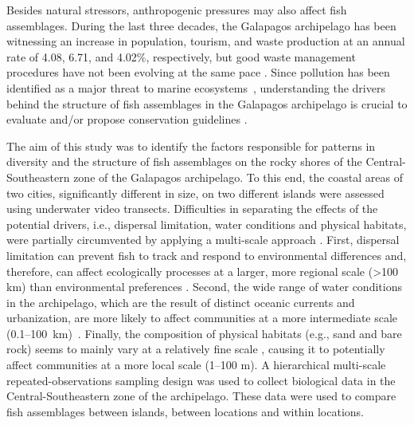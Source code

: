 \documentclass[jmse,article,accept,moreauthors,pdftex]{Definitions/mdpi}
\begin{document}
Besides natural stressors, anthropogenic pressures may also affect fish assemblages. During the last three decades, the Galapagos archipelago has been witnessing an increase in population, tourism, and waste production at an annual rate of 4.08, 6.71, and \mbox{4.02\%}, respectively, but good waste management procedures have not been evolving at the {same pace} %
 \citep{Fernandez2008CoastalIsland,Hardter2010WasteIslands,MinistryofTourismofEcuador2019Observatorio2019-09-12,Riascos-Flores2020PollutedEcuador}. Since pollution has been identified as a major threat to marine ecosystems~\citep{Boersma1999LimitingSolution}, understanding the drivers behind the structure of fish assemblages in the Galapagos archipelago is crucial to evaluate and/or propose conservation guidelines \citep{Mateus2019AnArchipelago}. 

The aim of this study was to identify the factors responsible for patterns in diversity and the structure of fish assemblages on the rocky shores of the Central-Southeastern zone of the Galapagos archipelago. To this end, the coastal areas of two cities, significantly different in size, on two different islands were assessed using underwater video transects. 
Difficulties in separating the effects of the potential drivers, i.e., dispersal limitation, water conditions and physical habitats, were partially circumvented by applying a multi-scale approach \citep{Thuiller2015}. First, dispersal limitation can prevent fish to track and respond to environmental differences and, therefore, can affect ecologically processes at a larger, more regional scale (>100 km) than environmental preferences \citep{Bruneel2018,Leibold2004,Leibold2017}. Second, the wide range of water conditions in the archipelago, which are the result of distinct oceanic currents and urbanization, are more likely to affect communities at a more intermediate scale \mbox{(\mbox{0.1--100 km}) \citep{Houvenaghel1978OceanographicIslands,Liu2014,Mateus2019AnArchipelago}.} Finally, the composition of physical habitats (e.g., sand and bare rock) seems to mainly vary at a relatively fine scale \citep{Okey2004AStrategies}, causing it to potentially affect communities at a more local scale (1--100 m). 
A hierarchical multi-scale repeated-observations sampling design was used to collect biological data in the Central-Southeastern zone of the archipelago. These data were used to compare fish assemblages between islands, between locations and within locations. 
\end{document}
